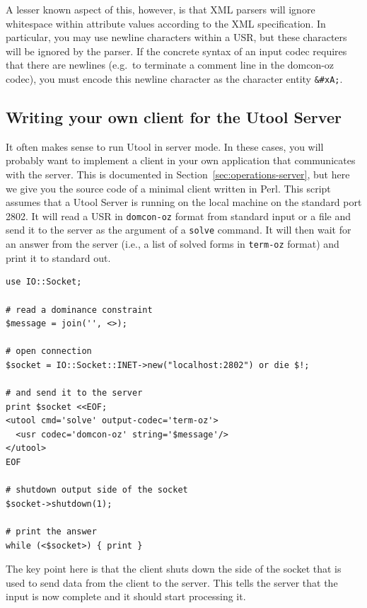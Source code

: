 \begin{enumerate}
A lesser known aspect of this, however, is that XML parsers will
ignore whitespace within attribute values according to the XML
specification. In particular, you may use newline characters within a
USR, but these characters will be ignored by the parser. If the
concrete syntax of an input codec requires that there are newlines
(e.g.\ to terminate a comment line in the domcon-oz codec), you must
encode this newline character as the character entity \verb?&#xA;?.
\end{enumerate}




\subsection{Writing your own client for the Utool Server}
\label{sec:practice-client}

It often makes sense to run Utool in server mode. In these cases, you
will probably want to implement a client in your own application that
communicates with the server. This is documented in
Section~\ref{sec:operations-server}, but here we give you the source
code of a minimal client written in Perl. This script assumes that a
Utool Server is running on the local machine on the standard port
2802. It will read a USR in \verb?domcon-oz? format from standard
input or a file and send it to the server as the argument of a
\verb?solve? command. It will then wait for an answer from the server
(i.e., a list of solved forms in \verb?term-oz? format) and print it
to standard out.

\begin{verbatim}
use IO::Socket;

# read a dominance constraint
$message = join('', <>);

# open connection
$socket = IO::Socket::INET->new("localhost:2802") or die $!;

# and send it to the server
print $socket <<EOF;
<utool cmd='solve' output-codec='term-oz'>
  <usr codec='domcon-oz' string='$message'/>
</utool>
EOF

# shutdown output side of the socket
$socket->shutdown(1);

# print the answer 
while (<$socket>) { print }
\end{verbatim}

The key point here is that the client shuts down the side of the
socket that is used to send data from the client to the server. This
tells the server that the input is now complete and it should start
processing it.

